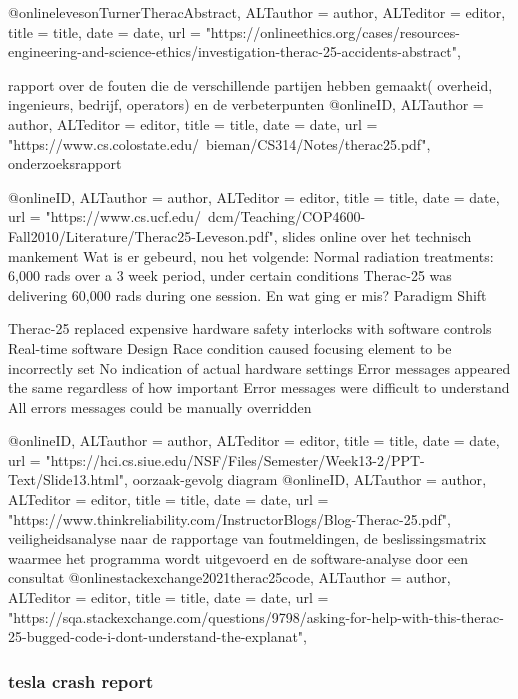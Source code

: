 {{@online{levesonTurnerTheracAbstract,	ALTauthor = {author},	ALTeditor = {editor},	title = {title},	date = {date},	url = {"https://onlineethics.org/cases/resources-engineering-and-science-ethics/investigation-therac-25-accidents-abstract"},}
\cite{levesonTurnerTheracAbstract}

rapport over de fouten die de verschillende partijen hebben gemaakt( overheid, ingenieurs, bedrijf, operators) en de verbeterpunten
@online{ID,	ALTauthor = {author},	ALTeditor = {editor},	title = {title},	date = {date},	url = {"https://www.cs.colostate.edu/~bieman/CS314/Notes/therac25.pdf"},}
\cite{}
onderzoeksrapport

@online{ID,	ALTauthor = {author},	ALTeditor = {editor},	title = {title},	date = {date},	url = {"https://www.cs.ucf.edu/~dcm/Teaching/COP4600-Fall2010/Literature/Therac25-Leveson.pdf"},}
\cite{}
slides online over het technisch mankement
Wat is er gebeurd, nou het volgende:
Normal radiation treatments: 6,000 rads over a 3 week period, under certain conditions Therac-25 was delivering 60,000 rads during one session.
En wat ging er mis?
Paradigm Shift

Therac-25 replaced expensive hardware safety interlocks with software controls
Real-time software
Design
Race condition caused focusing element to be incorrectly set
No indication of actual hardware settings
Error messages appeared the same regardless of how important
Error messages were difficult to understand
All errors messages could be manually overridden

@online{ID,	ALTauthor = {author},	ALTeditor = {editor},	title = {title},	date = {date},	url = {"https://hci.cs.siue.edu/NSF/Files/Semester/Week13-2/PPT-Text/Slide13.html"},}
\cite{}
oorzaak-gevolg diagram
@online{ID,	ALTauthor = {author},	ALTeditor = {editor},	title = {title},	date = {date},	url = {"https://www.thinkreliability.com/InstructorBlogs/Blog-Therac-25.pdf"},}
\cite{}
veiligheidsanalyse naar de rapportage van foutmeldingen, de beslissingsmatrix waarmee het programma wordt uitgevoerd en de software-analyse door een consultat
@online{stackexchange2021therac25code,	ALTauthor = {author},	ALTeditor = {editor},	title = {title},	date = {date},	url = {"https://sqa.stackexchange.com/questions/9798/asking-for-help-with-this-therac-25-bugged-code-i-dont-understand-the-explanat"},}
\cite{stackexchange2021therac25code}


\subsubsection{tesla crash report}

}}
